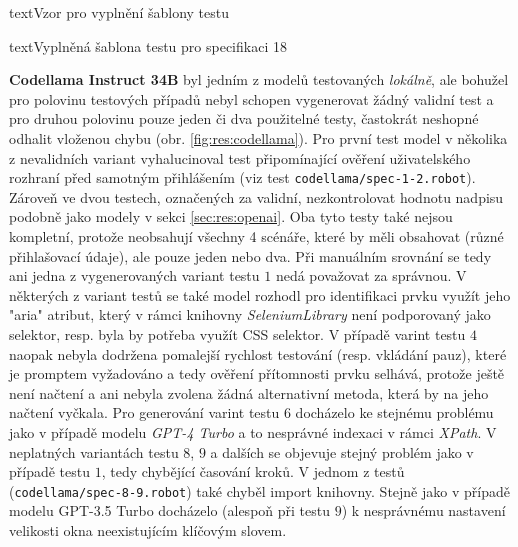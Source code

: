 \documentclass[czech, ma, kiv, he, iso690numb, pdf, viewonly]{fasthesis}
\begin{document}
\begin{code}{text}{Vzor pro vyplnění šablony testu \label{lst:template}}
{\begin{code}{text}{Vyplněná šablona testu pro specifikaci 18 \label{lst:spec18}}
{            \textbf{Codellama Instruct 34B} byl jedním z modelů testovaných \textit{lokálně}, ale bohužel pro polovinu testových případů nebyl schopen vygenerovat žádný validní test a pro druhou polovinu pouze jeden či dva použitelné testy, častokrát neshopné odhalit vloženou chybu (obr. \ref{fig:res:codellama}). Pro první test model v několika z nevalidních variant vyhalucinoval test připomínající ověření uživatelského rozhraní před samotným přihlášením (viz test \verb|codellama/spec-1-2.robot|). Zároveň ve dvou testech, označených za validní, nezkontrolovat hodnotu nadpisu podobně jako modely v sekci \ref{sec:res:openai}. Oba tyto testy také nejsou kompletní, protože neobsahují všechny 4 scénáře, které by měli obsahovat (různé přihlašovací údaje), ale pouze jeden nebo dva. Při manuálním srovnání se tedy ani jedna z vygenerovaných variant testu \(1\) nedá považovat za správnou. V některých z variant testů se také model rozhodl pro identifikaci prvku využít jeho "aria" atribut, který v rámci knihovny \textit{SeleniumLibrary} není podporovaný jako selektor, resp. byla by potřeba využít CSS selektor. V případě varint testu \(4\) naopak nebyla dodržena pomalejší rychlost testování (resp. vkládání pauz), které je promptem vyžadováno a tedy ověření přítomnosti prvku selhává, protože ještě není načtení a ani nebyla zvolena žádná alternativní metoda, která by na jeho načtení vyčkala. Pro generování varint testu \(6\) docházelo ke stejnému problému jako v případě modelu \textit{GPT-4 Turbo} a to nesprávné indexaci v rámci \textit{XPath}. V neplatných variantách testu \(8\), \(9\) a dalších se objevuje stejný problém jako v případě testu \(1\), tedy chybějící časování kroků. V jednom z testů (\verb|codellama/spec-8-9.robot|) také chyběl import knihovny. Stejně jako v případě modelu GPT-3.5 Turbo docházelo (alespoň při testu \(9\)) k nesprávnému nastavení velikosti okna neexistujícím klíčovým slovem.

}
\end{code}}
\end{code}
\end{document}
